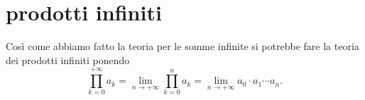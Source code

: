 \begin{comment}
\begin{theorem}[somme più che numerabili]
  Sia $f$ una funzione definita su un insieme $A$
  a valori reali o complessi. Se $f$ è sommabile
  su $A$ allora l'insieme
  \[
    \ENCLOSE{x\in A\colon f(x)\neq 0}
  \]
  è al più numerabile.
\end{theorem}
%
\begin{proof}
Supponiamo dapprima che $f$ abbia valori reali.
Se l'insieme $\ENCLOSE{f\neq 0}$ fosse più che numerabile almeno uno dei due insiemi $\ENCLOSE{f>0}$ o $\ENCLOSE{f<0}$
sarebbe più che numerabile.
Senza perdita di generalità possiamo supporre che sia
il primo cioè che $A_+ = \ENCLOSE{x \in A\colon f(x)>0}$
sia più che numerabile. Considero allora per ogni $n\in \NN$
gli insiemi $A_n = \ENCLOSE{x\in A\colon \frac 1 {f(x)} \in (n,n+1]}$. Almeno uno di questi insiemi
deve essere infinito perché se gli $A_n$ fossero
tutti finiti allora l'insieme $A=\bigcup_n A_n$ sarebbe
numerabile. Dunque esiste $N\in \NN$ tale che $A_N$ è infinito.
Posto $\eps = \frac{1}{N+1}>0$
esistono dunque $x_0,x_1, \dots, x_k, \dots$ infiniti punti di $A$ tali che $f(x_k) \ge \eps$.

***DUBBIO*** Se $A$ è più che numerabile
esiste $A_n$ finito tale che $A_n\to A$?
\end{proof}
\end{comment}
\begin{comment}

\begin{theorem}[somme iterate]
Sia $f$ una funzione definita su un insieme $A$ a
valori reali o complessi. Supponiamo che sia
\[
  A = \bigcup_{k\in K} A_k
\]
dove $K$ è un arbitrario insieme di indici e
$A_k$ sono sottoinsiemi di $A$ a due a due disgiunti.
Allora
\[
  \sum_{x\in A} f(x) = \sum_{k\in K} \sum_{x\in A_k} f(x)
\]
se almeno uno dei due lati dell'uguaglianza esiste.
\end{theorem}
\end{comment}

\section{prodotti infiniti}

Così come abbiamo fatto la teoria per le somme infinite si potrebbe fare
la teoria dei prodotti infiniti ponendo
\[
  \prod_{k=0}^{+\infty} a_k = \lim_{n\to +\infty} \prod_{k=0}^n a_k
  = \lim_{n\to +\infty} a_0 \cdot a_1 \cdots a_n.
\]


